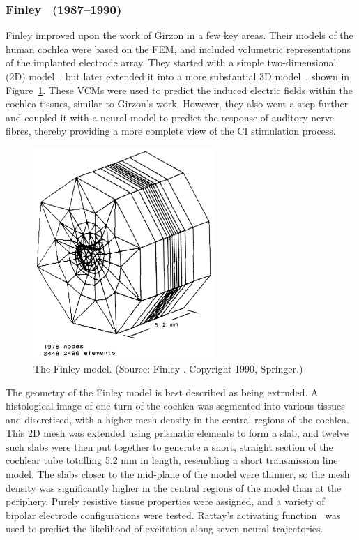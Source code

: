 \subsubsection{Finley \etal~(1987--1990)}

Finley \etal{} improved upon the work of Girzon in a few key areas. Their models
of the human cochlea were based on the FEM, and included volumetric
representations of the implanted electrode array. They started with a simple
two-dimensional (2D) model~\cite{finley1987}, but later extended it into a more
substantial 3D model~\cite{finley1989,finley1990}, shown in
Figure~\ref{fig:model_finley}. These VCMs were used to predict the induced
electric fields within the cochlea tissues, similar to Girzon's work. However,
they also went a step further and coupled it with a neural model to predict the
response of auditory nerve fibres, thereby providing a more complete view of the
CI stimulation process.

\begin{figure}
	\centering
	\includegraphics[height=8cm]{Background/finley}
	\caption[The Finley model]{The Finley model. (Source: Finley
	\etal\cite{finley1990}. Copyright \textcopyright{} 1990, Springer.)}
	\label{fig:model_finley}
\end{figure}

The geometry of the Finley model is best described as being extruded. A
histological image of one turn of the cochlea was segmented into various tissues
and discretised, with a higher mesh density in the central regions of the
cochlea. This 2D mesh was extended using prismatic elements to form a slab, and
twelve such slabs were then put together to generate a short, straight section
of the cochlear tube totalling 5.2 mm in length, resembling a short transmission
line model. The slabs closer to the mid-plane of the model were thinner, so the
mesh density was significantly higher in the central regions of the model than
at the periphery. Purely resistive tissue properties were assigned, and a
variety of bipolar electrode configurations were tested. Rattay's activating
function~\cite{rattay1986,rattay1990} was used to predict the likelihood of
excitation along seven neural trajectories.

